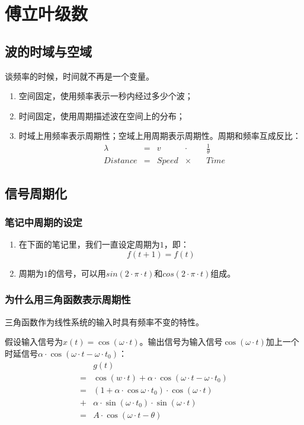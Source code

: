 \chapter{傅立叶级数}
\section{波的时域与空域}
谈频率的时候，时间就不再是一个变量。
\begin{enumerate}
	\item 空间固定，使用频率表示一秒内经过多少个波；
	\item 时间固定，使用周期描述波在空间上的分布；
	\item 时域上用频率表示周期性；空域上用周期表示周期性。周期和频率互成反比：
	      \begin{align*}
		       & \lambda  & = & v     & \cdot   \quad & \frac{1}{\theta} \\
		       & Distance & = & Speed & \times  \quad & Time
	      \end{align*}
\end{enumerate}

\section{信号周期化}
\subsection{笔记中周期的设定}
\begin{enumerate}
	\item 在下面的笔记里，我们一直设定周期为$1$，即：
	      \begin{equation}
		      f(t+1)=f(t)
	      \end{equation}
	\item 周期为$1$的信号，可以用$sin(2\cdot \pi \cdot t)$和$cos(2\cdot \pi \cdot t)$组成。

\end{enumerate}
\subsection{为什么用三角函数表示周期性}
三角函数作为线性系统的输入时具有频率不变的特性。

假设输入信号为$x(t)=\cos (\omega\cdot t)$。输出信号为输入信号$\cos (\omega\cdot t)$加上一个时延信号$\alpha\cdot \cos (\omega\cdot t-\omega\cdot t_0)$：
\begin{align*}
	  & g(t)                                                            \\
	= & \cos(w\cdot t)+\alpha\cdot \cos (\omega\cdot t-\omega\cdot t_0) \\
	= & (1+\alpha \cdot \cos\omega\cdot t_0)\cdot \cos (\omega\cdot t)  \\
	+ & \alpha\cdot \sin(\omega\cdot t_0)\cdot \sin(\omega\cdot t)      \\
	= & A\cdot \cos(\omega\cdot t-\theta)
\end{align*}

